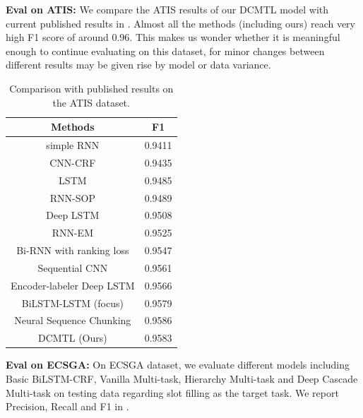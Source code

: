 \noindent
\textbf{Eval on ATIS:} We compare the ATIS results of our DCMTL model with current published results in .
Almost all the methods (including ours) 
reach very high F1 score of around 0.96.
This makes us wonder
whether it is meaningful enough to continue evaluating on this dataset,
for minor changes between different results may be given rise by model or data variance.
\begin{table}[th]
	\centering
	\caption{Comparison with published results on the ATIS dataset.}
	\label{tab:eval_ATIS}
	\scriptsize
	\begin{tabular}{c|c}
		\toprule
		Methods & F1 \\
		\midrule
		simple RNN \cite{yao2013recurrent} & 0.9411 \\
		CNN-CRF \cite{xu2013convolutional} & 0.9435 \\
		LSTM \cite{yao2014spoken} & 0.9485 \\
		RNN-SOP \cite{liu2015recurrent} & 0.9489 \\
		Deep LSTM \cite{yao2014spoken} & 0.9508 \\
		RNN-EM \cite{peng2015recurrent} & 0.9525 \\
		Bi-RNN with ranking loss \cite{vu2016bi} & 0.9547 \\
		Sequential CNN  \cite{vu2016sequential} & 0.9561 \\
		Encoder-labeler Deep LSTM \cite{kurata2016leveraging} & 0.9566 \\
		BiLSTM-LSTM (focus) \cite{zhu2017encoder} & 0.9579 \\
		Neural Sequence Chunking \cite{zhai2017neural} & 0.9586 \\
		\midrule
		DCMTL (Ours) & 0.9583  \\
		\bottomrule
	\end{tabular}
	\vspace{-10pt}
\end{table}

\noindent
\textbf{Eval on ECSGA:}
On ECSGA dataset,
we evaluate different models including 
Basic BiLSTM-CRF, Vanilla Multi-task, 
Hierarchy Multi-task and Deep Cascade Multi-task
on testing data regarding slot filling as the target task.
We report Precision, Recall and F1 in .

